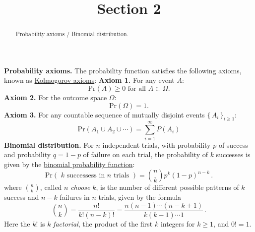 \documentclass{ximera}
\title{Section 2}
\begin{document}
\begin{abstract}
Probability axioms / Binomial distribution.
\end{abstract}
\maketitle

{\bf Probability axioms.} The probability function satisfies the following axioms, known as \href{http://en.wikipedia.org/wiki/Probability_axioms}{Kolmogorov axioms}:
\vspace{.35cm}
\newline
{\bf Axiom 1.} For any event $A$: 
\[ 
\text{Pr}(A)\geq 0 \text{ for all }A\subset \Omega .  
\]
{\bf Axiom 2.} For the outcome space $\Omega$:
\[ 
\text{Pr}(\Omega) = 1. 
\] 
{\bf Axiom 3.}  For any countable sequence of mutually disjoint events $\{\,A_{i}\,\}_{i\geq 1}$:
\[  
\text{Pr}(A_{1} \cup A_{2} \cup \cdots ) = \sum_{i=1}^{\infty} P(A_{i})
\] 
\vspace{1cm}
\newline
{\bf Binomial distribution.} For $n$ independent trials, with probability $p$ of success and probability $q=1-p$ of failure on each trial, the probability of $k$ successes is given by the \href{http://en.wikipedia.org/wiki/Binomial_distribution}{binomial probability function}: 
\[
\text{Pr}( \,\, k \text{ successess in } n \text{ trials }) = {n\choose k}p^{k}(1-p)^{n-k}\,.
\]
where ${n\choose k}$, called $n$ {\it choose} $k$, is the number of different possible patterns of $k$ success and $n-k$ failures in $n$ trials, given by the formula
\[
{n\choose k} = \frac{n!}{k!(n-k)!} = \frac{n(n-1)\cdots(n-k+1)}{k(k-1)\cdots 1}\,.
\]
Here the $k!$ is $k$ {\it factorial}, the product of the first $k$ integers for $k\geq 1$, and $0! = 1$.
\end{document}

